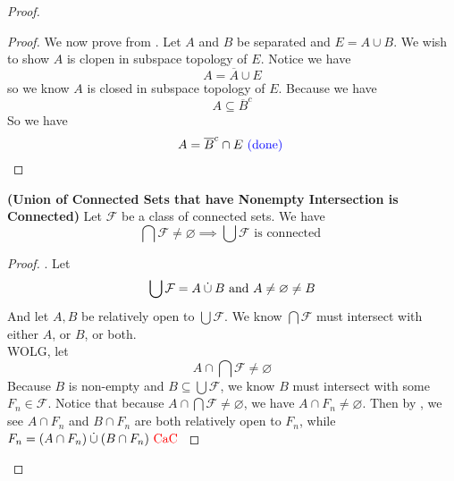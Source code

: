 \documentclass{report}
\begin{document}
\begin{proof}
\begin{proof}
We now prove from . Let $A$ and  $B$ be separated and  $E=A\cup B$. We wish to show $A$ is clopen in subspace topology of  $E$. Notice we have 
\begin{equation}
A=\overline{A}\cup E
\end{equation}
so we know $A$ is closed in subspace topology of  $E$. Because we have
\begin{equation}
A\subseteq \overline{B}^c
\end{equation}
So we have
\begin{equation}
A=\overline{B}^c \cap E \textcolor{blue}{\text{ (done) }}
\end{equation}
\end{proof}
\begin{theorem}
\label{6.3.3}
\textbf{(Union of Connected Sets that have Nonempty Intersection is Connected)} Let $\mathcal{F}$ be a class of connected sets. We have 
\begin{equation}
\bigcap \mathcal{F}\neq \varnothing \implies \bigcup \mathcal{F}\text{ is connected }
\end{equation}
\end{theorem}
\begin{proof}
. Let 
\begin{equation}
\bigcup  \mathcal{F}= A \mathbin{\dot{\cup}} B\text{ and }A\neq \varnothing\neq B
\end{equation}
And let $A,B$ be relatively open to  $\bigcup \mathcal{F}$. We know $\bigcap \mathcal{F}$ must intersect with either $A$, or  $B$, or both.\\

WOLG, let
\begin{equation}
A\cap \bigcap \mathcal{F}\neq \varnothing
\end{equation}
Because $B$ is non-empty and $B\subseteq \bigcup \mathcal{F}$, we know $B$ must intersect with some $F_n\in \mathcal{F}$. Notice that because $A\cap \bigcap \mathcal{F}\neq \varnothing$, we have $A\cap F_n\neq \varnothing$. Then by , we see $A\cap F_n$ and $B\cap F_n$ are both relatively open to $F_n$, while $F_n= (A\cap F_n)\mathbin{\dot{\cup}} (B\cap F_n)\text{ \textcolor{red}{CaC} }$ 
\end{proof}


\end{proof}
\end{document}
